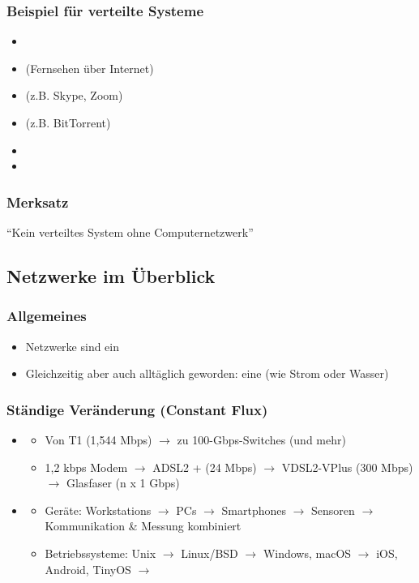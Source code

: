 \subsubsection*{Beispiel für verteilte Systeme}
\begin{itemize}
    \item {}
    \item {} (Fernsehen über Internet)
    \item {} (z.B. Skype, Zoom)
    \item {} (z.B. BitTorrent)
    \item {}
    \item {}
\end{itemize} 
\subsubsection*{Merksatz}
\enquote{Kein verteiltes System ohne Computernetzwerk}
\subsection{Netzwerke im Überblick}
\subsubsection*{Allgemeines}
\begin{itemize}
    \item Netzwerke sind ein 
    \item Gleichzeitig aber auch alltäglich geworden: eine  (wie Strom oder Wasser)
\end{itemize}
\subsubsection*{Ständige Veränderung (Constant Flux)}
\begin{itemize}
    \item {}
    \begin{itemize}
        \item {} Von T1 (1,544 Mbps) $\rightarrow$ zu 100-Gbps-Switches (und mehr)
        \item {} 1,2 kbps Modem $\rightarrow$ ADSL2 + (24 Mbps) $\rightarrow$ VDSL2-VPlus (300 Mbps) $\rightarrow$ Glasfaser (n x 1 Gbps)
    \end{itemize}
    \item {}
    \begin{itemize}
        \item Geräte: Workstations $\rightarrow$ PCs $\rightarrow$ Smartphones $\rightarrow$ Sensoren $\rightarrow$ Kommunikation \& Messung kombiniert
        \item Betriebssysteme: Unix $\rightarrow$ Linux/BSD $\rightarrow$ Windows, macOS $\rightarrow$ iOS, Android, TinyOS $\rightarrow$ 
    \end{itemize}
\end{itemize}

